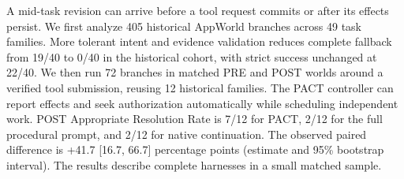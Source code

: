 A mid-task revision can arrive before a tool request commits or after its effects persist. We first analyze 405 historical AppWorld branches across 49 task families. More tolerant intent and evidence validation reduces complete fallback from 19/40 to 0/40 in the historical cohort, with strict success unchanged at 22/40. We then run 72 branches in matched PRE and POST worlds around a verified tool submission, reusing 12 historical families. The PACT controller can report effects and seek authorization automatically while scheduling independent work. POST Appropriate Resolution Rate is 7/12 for PACT, 2/12 for the full procedural prompt, and 2/12 for native continuation. The observed paired difference is +41.7 [16.7, 66.7] percentage points (estimate and 95\% bootstrap interval). The results describe complete harnesses in a small matched sample.

